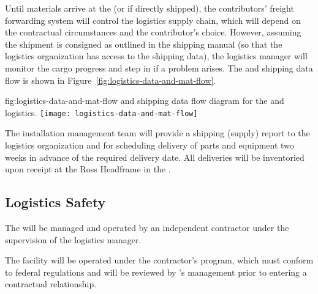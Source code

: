 Until materials arrive at the  (or  if directly shipped), the contributors' freight forwarding system will control the logistics supply chain, which will depend on the contractual circumstances and the contributor's choice. 
However, assuming the shipment is consigned as outlined in the  shipping manual (so that the 
logistics organization has access to the shipping data),  the logistics manager will monitor the cargo progress and step in if a problem arises. 
The  and shipping data flow is shown in Figure~\ref{fig:logistics-data-and-mat-flow}.

 


\begin{dunefigure}{fig:logistics-data-and-mat-flow}
  { and shipping data flow diagram for the  and  logistics.}
 \texttt{[image: logistics-data-and-mat-flow]}
\end{dunefigure}

 
The  installation management team will provide a shipping (supply) report to the  logistics organization and  for scheduling delivery of parts and equipment two weeks in advance of the required delivery date. 
All deliveries will be inventoried upon receipt at the Ross Headframe in the . 




\subsection{Logistics Safety}
\label{sec:fdsp-tc-log-safety}


The  will be managed and operated by an independent contractor under the supervision of the  logistics manager. 

The facility will be operated under the contractor's  program, which must conform to federal regulations and will be reviewed by 's  management prior to entering a contractual relationship.